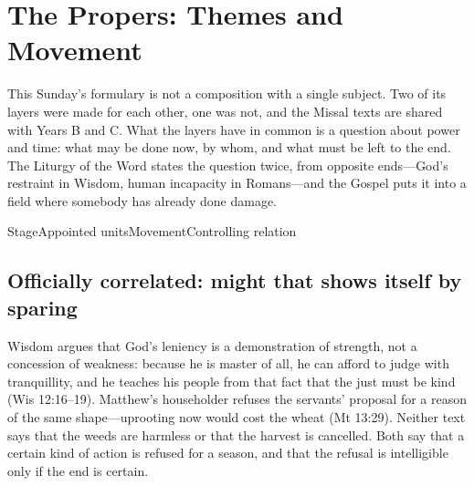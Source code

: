 \section*{The Propers: Themes and Movement}

This Sunday's formulary is not a composition with a single subject. Two of its
layers were made for each other, one was not, and the Missal texts are shared
with Years B and C. What the layers have in common is a question about power
and time: what may be done now, by whom, and what must be left to the end.
The Liturgy of the Word states the question twice, from opposite ends---God's
restraint in Wisdom, human incapacity in Romans---and the Gospel puts it into
a field where somebody has already done damage.

\begin{fourcoltable}{Stage}{Appointed units}{Movement}{Controlling relation}
\end{fourcoltable}

\subsection*{Officially correlated: might that shows itself by sparing}

Wisdom argues that God's leniency is a demonstration of strength, not a
concession of weakness: because he is master of all, he can afford to judge
with tranquillity, and he teaches his people from that fact that the just must
be kind (Wis 12:16--19). Matthew's householder refuses the servants'
proposal for a reason of the same shape---uprooting now would cost the wheat
(Mt 13:29). Neither text says that the weeds are harmless or that the harvest
is cancelled. Both say that a certain kind of action is refused for a season,
and that the refusal is intelligible only if the end is certain.

